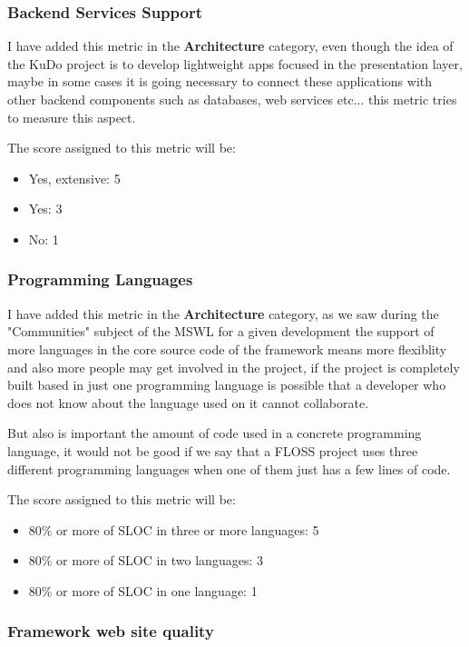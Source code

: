 \documentclass[a4paper,12pt]{book}
\begin{document}
\subsubsection{Backend Services Support}
\label{Backend Services Support}

I have added this metric in the \textbf{Architecture} category, even though the idea of the KuDo project is to develop lightweight apps focused in the presentation layer, maybe in some cases it is going necessary to connect these applications with other backend components such as databases, web services etc... this metric tries to measure this aspect.

The score assigned to this metric will be:
\begin{itemize}
 \item Yes, extensive: 5
 \item Yes: 3
 \item No: 1
\end{itemize}

\subsubsection{Programming Languages}
\label{Programming Languages}

I have added this metric in the \textbf{Architecture} category, as we saw during the "Communities" subject of the MSWL for a given development the support of more languages in the core source code of the framework means more flexiblity and also more people may get involved in the project, if the project is completely built based in just one programming language is possible that a developer who does not know about the language used on it cannot collaborate.

But also is important the amount of code used in a concrete programming language, it would not be good if we say that a FLOSS project uses three different programming languages when one of them just has a few lines of code.

The score assigned to this metric will be:
\begin{itemize}
 \item 80\% or more of SLOC in three or more languages: 5
 \item 80\% or more of SLOC in two languages: 3
 \item 80\% or more of SLOC in one language: 1
\end{itemize}

\subsubsection{Framework web site quality}
\label{Framework web site quality}
\end{document}
